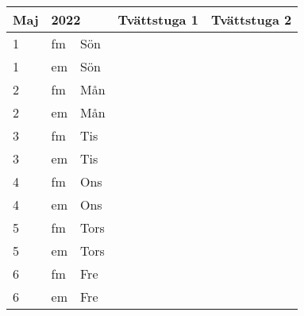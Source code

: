 \documentclass[a4paper]{article}
\begin{document}
\begin{table}[ht!]
\vspace{-10em}%
\normalsize
\begin{tabular}{lllp{7cm}p{7cm}}
\textbf{Maj}           & \multicolumn{2}{l}{\textbf{2022}}                  & \textbf{Tvättstuga 1} & \textbf{Tvättstuga 2} \\ \hline    

\multicolumn{1}{|l|}{1} & \multicolumn{1}{l|}{fm} & \multicolumn{1}{l|}{Sön} & \multicolumn{1}{l|}{} & \multicolumn{1}{l|}{} \\ \hline
\multicolumn{1}{|l|}{1} & \multicolumn{1}{l|}{em} & \multicolumn{1}{l|}{Sön} & \multicolumn{1}{l|}{} & \multicolumn{1}{l|}{} \\ \hline    

\multicolumn{1}{|l|}{2} & \multicolumn{1}{l|}{fm} & \multicolumn{1}{l|}{Mån} & \multicolumn{1}{l|}{} & \multicolumn{1}{l|}{} \\ \hline
\multicolumn{1}{|l|}{2} & \multicolumn{1}{l|}{em} & \multicolumn{1}{l|}{Mån} & \multicolumn{1}{l|}{} & \multicolumn{1}{l|}{} \\ \hline    

\multicolumn{1}{|l|}{3} & \multicolumn{1}{l|}{fm} & \multicolumn{1}{l|}{Tis} & \multicolumn{1}{l|}{} & \multicolumn{1}{l|}{} \\ \hline
\multicolumn{1}{|l|}{3} & \multicolumn{1}{l|}{em} & \multicolumn{1}{l|}{Tis} & \multicolumn{1}{l|}{} & \multicolumn{1}{l|}{} \\ \hline    

\multicolumn{1}{|l|}{4} & \multicolumn{1}{l|}{fm} & \multicolumn{1}{l|}{Ons} & \multicolumn{1}{l|}{} & \multicolumn{1}{l|}{} \\ \hline
\multicolumn{1}{|l|}{4} & \multicolumn{1}{l|}{em} & \multicolumn{1}{l|}{Ons} & \multicolumn{1}{l|}{} & \multicolumn{1}{l|}{} \\ \hline    

\multicolumn{1}{|l|}{5} & \multicolumn{1}{l|}{fm} & \multicolumn{1}{l|}{Tors} & \multicolumn{1}{l|}{} & \multicolumn{1}{l|}{} \\ \hline
\multicolumn{1}{|l|}{5} & \multicolumn{1}{l|}{em} & \multicolumn{1}{l|}{Tors} & \multicolumn{1}{l|}{} & \multicolumn{1}{l|}{} \\ \hline    

\multicolumn{1}{|l|}{6} & \multicolumn{1}{l|}{fm} & \multicolumn{1}{l|}{Fre} & \multicolumn{1}{l|}{} & \multicolumn{1}{l|}{} \\ \hline
\multicolumn{1}{|l|}{6} & \multicolumn{1}{l|}{em} & \multicolumn{1}{l|}{Fre} & \multicolumn{1}{l|}{} & \multicolumn{1}{l|}{} \\ \hline    


\end{tabular}
\end{table}
\end{document}
